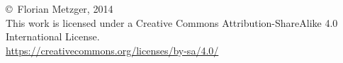 \newpage
\thispagestyle{empty}
\null
\vfill
\begin{center}
\copyright~Florian Metzger, 2014\\
This work is licensed under a Creative Commons Attribution-ShareAlike 4.0 International License.\\
\url{https://creativecommons.org/licenses/by-sa/4.0/}
\vskip 0.5cm
\ccbysa
\end{center}

